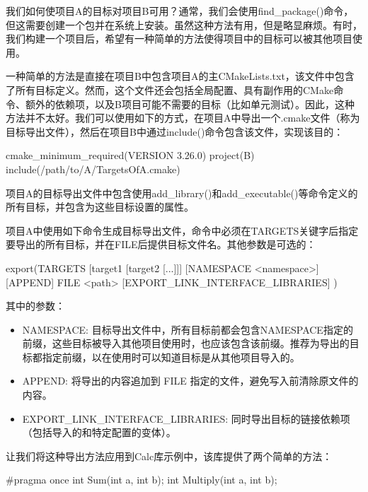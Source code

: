 我们如何使项目A的目标对项目B可用？通常，我们会使用find\_package()命令，但这需要创建一个包并在系统上安装。虽然这种方法有用，但是略显麻烦。有时，我们构建一个项目后，希望有一种简单的方法使得项目中的目标可以被其他项目使用。

一种简单的方法是直接在项目B中包含项目A的主CMakeLists.txt，该文件中包含了所有目标定义。然而，这个文件还会包括全局配置、具有副作用的CMake命令、额外的依赖项，以及B项目可能不需要的目标（比如单元测试）。因此，这种方法并不太好。我们可以使用如下的方式，在项目A中导出一个.cmake文件（称为目标导出文件），然后在项目B中通过include()命令包含该文件，实现该目的：

\begin{cmake}
cmake_minimum_required(VERSION 3.26.0)
project(B)
include(/path/to/A/TargetsOfA.cmake)
\end{cmake}

项目A的目标导出文件中包含使用add\_library()和add\_executable()等命令定义的所有目标，并包含为这些目标设置的属性。

项目A中使用如下命令生成目标导出文件，命令中必须在TARGETS关键字后指定要导出的所有目标，并在FILE后提供目标文件名。其他参数是可选的：

\begin{shell}
export(TARGETS [target1 [target2 [...]]]
       [NAMESPACE <namespace>] [APPEND] FILE <path>
       [EXPORT_LINK_INTERFACE_LIBRARIES]
)
\end{shell}

其中的参数：

\begin{itemize}
\item
NAMESPACE: 目标导出文件中，所有目标前都会包含NAMESPACE指定的前缀，这些目标被导入其他项目使用时，也应该包含该前缀。推荐为导出的目标都指定前缀，以在使用时可以知道目标是从其他项目导入的。

\item
APPEND: 将导出的内容追加到 FILE 指定的文件，避免写入前清除原文件的内容。

\item
EXPORT\_LINK\_INTERFACE\_LIBRARIES: 同时导出目标的链接依赖项（包括导入的和特定配置的变体）。
\end{itemize}

让我们将这种导出方法应用到Calc库示例中，该库提供了两个简单的方法：


\begin{cpp}
#pragma once
int Sum(int a, int b);
int Multiply(int a, int b);
\end{cpp}

